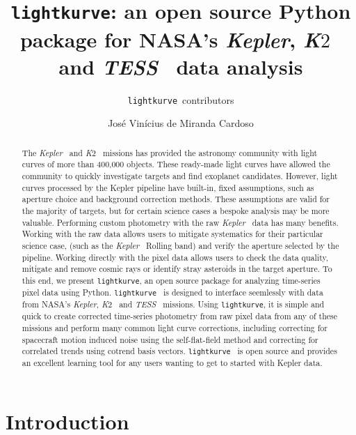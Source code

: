 \documentclass[twocolumn]{aastex62}
\newcommand{\ktwo}{{\it K$\mathit{2}$}}
\newcommand{\tess}{{\it TESS}}
\newcommand{\kepler}{{\it Kepler}}
\newcommand{\lightkurve}{\texttt{lightkurve}}
\begin{document}
\title{\lightkurve: an open source Python package for NASA's \kepler, \ktwo~ and \tess~ data analysis}


\author{\lightkurve~contributors}

\author{Jos\'e Vin\'icius de Miranda Cardoso}

\begin{abstract}
    The \kepler~ and \ktwo~ missions has provided the astronomy community with light curves of more than 400,000 objects.
    These ready-made light curves have allowed the community to quickly investigate targets and find exoplanet
    candidates. However, light curves processed by the Kepler pipeline have built-in, fixed assumptions, such as
    aperture choice and background correction methods. These assumptions are valid for the majority of targets,
    but for certain science cases a bespoke analysis may be more valuable. Performing custom photometry with the raw
    \kepler~ data has many benefits. Working with the raw data allows users to mitigate systematics for their
    particular science case, (such as the \kepler~ Rolling band) and verify the aperture selected by the pipeline.
    Working directly with the pixel data allows users to check the data quality, mitigate and remove cosmic
    rays or identify stray asteroids in the target aperture. To this end, we present \lightkurve, an open
    source package for analyzing time-series pixel data using Python. \lightkurve~ is designed to interface
    seemlessly with data from NASA's \kepler, \ktwo~ and \tess~ missions. Using \lightkurve, it is
    simple and quick to create corrected time-series photometry from raw pixel data from any of these
    missions and perform many common light curve corrections, including correcting for spacecraft motion induced
    noise using the self-flat-field method and correcting for correlated trends using cotrend basis
    vectors. \lightkurve~ is open source and provides an excellent learning tool for any users wanting
    to get to started with Kepler data.
\end{abstract}


\section{Introduction} \label{sec:intro}
\end{document}
